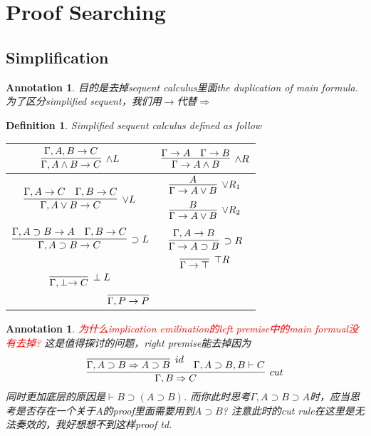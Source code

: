 \documentclass{article}
\theoremstyle{plain}
\newtheorem{definition}[theorem]{Definition}
\newtheorem{annotation}[theorem]{Annotation}
\theoremstyle{nonumberplain}
\newcommand{\redt}[1]{\textcolor{red}{#1}}
\begin{document}
\newpage
\section{Proof Searching}

\subsection{Simplification}

\begin{annotation}
\rm 目的是去掉sequent calculus里面the duplication of main formula. 为了区分simplified sequent，我们用$\to$代替$\Rightarrow$
\end{annotation}

\begin{definition}
\rm \cite{15-317-rsc}Simplified sequent calculus defined as follow
\begin{center}
\begin{tabular}{|c|c|}
\hline $\infer[\wedge L]{\Gamma, A \wedge B \to C}{\Gamma, A, B \to C}$  & $\infer[\wedge R]{\Gamma \to A \wedge B}{\Gamma \to A & \Gamma \to B}$ \rule{0em}{3em} \\
\hline $\infer[\vee L]{\Gamma, A \vee B \to C}{\Gamma, A \to C & \Gamma, B \to C}$ & $\begin{aligned}\infer[\vee R_1]{\Gamma \to A \vee B}{A} \\ \infer[\vee R_2]{\Gamma\to A \vee B}{B} \end{aligned}$ \rule{0em}{3em}\\
\hline $\infer[\supset L]{\Gamma, A \supset B \to C}{\Gamma, A \supset B \to A & \Gamma, B \to C}$ & $\infer[\supset R]{\Gamma \to A \supset B}{\Gamma, A \to B}$ \rule{0em}{3em} \\
\hline & $\infer[\top R]{\Gamma \to \top}{}$ \rule{0em}{2em}\\
\hline $\infer[\perp L]{\Gamma, \perp \to C}{}$ & \rule{0em}{2em}\\
\hline \multicolumn{2}{|c|}{$\infer[]{\Gamma,P \to P}{}$}\rule{0em}{2em}\\
\hline
\end{tabular}
\end{center}
\end{definition}

\begin{annotation}
\rm \redt{为什么implication emilination的left premise中的main formual没有去掉?} 这是值得探讨的问题，right premise能去掉因为
$$
\infer[cut]{\Gamma, B \Rightarrow C}{\infer[id]{\Gamma, A \supset B \Rightarrow A \supset B}{} & \Gamma,A \supset B, B \vdash C}
$$
同时更加底层的原因是$\vdash B \supset (A \supset B)$. 而你此时思考$\Gamma, A \supset B \supset A$时，应当思考是否存在一个关于$A$的proof里面需要用到$A \supset B$? 注意此时的\emph{cut} rule在这里是无法奏效的，我好想想不到这样proof td.
\end{annotation}
\end{document}
